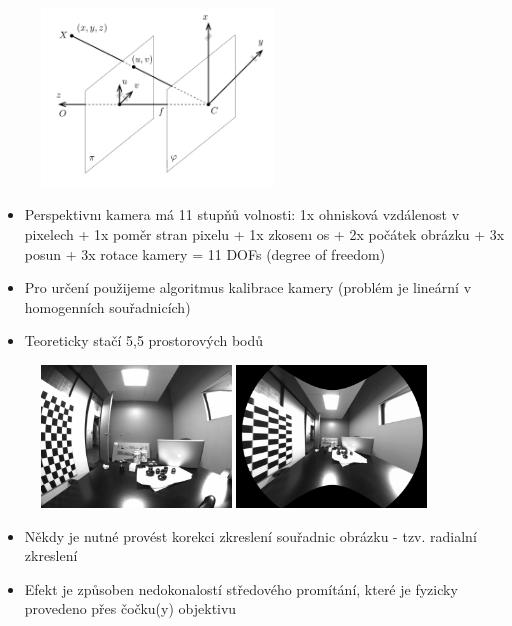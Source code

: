 \begin{frame}
\begin{figure}[h]
\centering
\includegraphics[width=0.55\textwidth]{./fig01}
\end{figure}

\begin{itemize}
\item Perspektivnı kamera má 11 stupňů volnosti: 1x ohnisková
vzdálenost v pixelech + 1x poměr stran pixelu + 1x zkosenı os
+ 2x počátek obrázku + 3x posun + 3x rotace kamery = 11
DOFs (degree of freedom)
\item Pro určení použijeme algoritmus kalibrace kamery (problém je lineární v homogenních souřadnicích)
\item Teoreticky stačí 5,5 prostorových bodů
\end{itemize}

\end{frame}

\begin{frame}

\begin{figure}[h]
 \centering
 \includegraphics[width=0.45\textwidth]{./fig17}
 \includegraphics[width=0.45\textwidth]{./fig16}
 \end{figure}
\begin{itemize}

\item Někdy je nutné provést korekci zkreslení souřadnic obrázku - tzv. radialní zkreslení
\item Efekt je způsoben nedokonalostí středového promítání, které je fyzicky provedeno přes čočku(y) objektivu
\end{itemize}
\end{frame}

